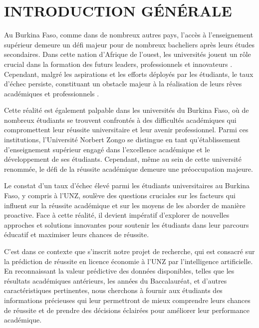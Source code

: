 \chapter*{INTRODUCTION GÉNÉRALE}
\adjustmtc
\thispagestyle{MyStyle}

Au Burkina Faso, comme dans de nombreux autres pays, l'accès à l'enseignement supérieur demeure un défi majeur pour de nombreux bacheliers après leurs études secondaires. Dans cette nation d'Afrique de l'ouest, les universités jouent un rôle crucial dans la formation des futurs leaders, professionnels et innovateurs \cite{unesco}. Cependant, malgré les aspirations et les efforts déployés par les étudiants, le taux d'échec persiste, constituant un obstacle majeur à la réalisation de leurs rêves académiques et professionnels \cite{lefaso}.

Cette réalité est également palpable dans les universités du Burkina Faso, où de nombreux étudiants se trouvent confrontés à des difficultés académiques qui compromettent leur réussite universitaire et leur avenir professionnel. Parmi ces institutions, l'Université Norbert Zongo se distingue en tant qu'établissement d'enseignement supérieur engagé dans l'excellence académique et le développement de ses étudiants. Cependant, même au sein de cette université renommée, le défi de la réussite académique demeure une préoccupation majeure.

Le constat d'un taux d'échec élevé parmi les étudiants universitaires au Burkina Faso, y compris à l'UNZ, soulève des questions cruciales sur les facteurs qui influent sur la réussite académique et sur les moyens de les aborder de manière proactive. Face à cette réalité, il devient impératif d'explorer de nouvelles approches et solutions innovantes pour soutenir les étudiants dans leur parcours éducatif et maximiser leurs chances de réussite.

C'est dans ce contexte que s'inscrit notre projet de recherche, qui est consacré sur la prédiction de réussite en licence économie à l'UNZ par l'intelligence artificielle. En reconnaissant la valeur prédictive des données disponibles, telles que les résultats académiques antérieurs, les années du Baccalauréat, et d'autres caractéristiques pertinentes, nous cherchons à fournir aux étudiants des informations précieuses qui leur permettront de mieux comprendre leurs chances de réussite et de prendre des décisions éclairées pour améliorer leur performance académique.

